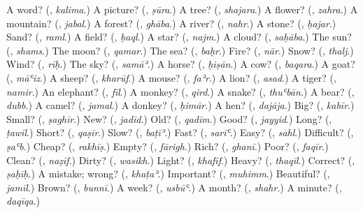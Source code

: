 \begin{tcolorbox}[breakable,colback=teal!4,colframe=teal!35!black,title={Before you move on}]
A word? (\textbf{}, \emph{kalima}.) A picture? (\textbf{}, \emph{ṣūra}.) A tree? (\textbf{}, \emph{shajara}.) A flower? (\textbf{}, \emph{zahra}.) A mountain? (\textbf{}, \emph{jabal}.) A forest? (\textbf{}, \emph{ghāba}.) A river? (\textbf{}, \emph{nahr}.) A stone? (\textbf{}, \emph{ḥajar}.) Sand? (\textbf{}, \emph{raml}.) A field? (\textbf{}, \emph{ḥaql}.) A star? (\textbf{}, \emph{najm}.) A cloud? (\textbf{}, \emph{saḥāba}.) The sun? (\textbf{}, \emph{shams}.) The moon? (\textbf{}, \emph{qamar}.) The sea? (\textbf{}, \emph{baḥr}.) Fire? (\textbf{}, \emph{nār}.) Snow? (\textbf{}, \emph{thalj}.) Wind? (\textbf{}, \emph{rīḥ}.) The sky? (\textbf{}, \emph{samāʾ}.) A horse? (\textbf{}, \emph{ḥiṣān}.) A cow? (\textbf{}, \emph{baqara}.) A goat? (\textbf{}, \emph{māʿiz}.) A sheep? (\textbf{}, \emph{kharūf}.) A mouse? (\textbf{}, \emph{faʾr}.) A lion? (\textbf{}, \emph{asad}.) A tiger? (\textbf{}, \emph{namir}.) An elephant? (\textbf{}, \emph{fīl}.) A monkey? (\textbf{}, \emph{qird}.) A snake? (\textbf{}, \emph{thuʿbān}.) A bear? (\textbf{}, \emph{dubb}.) A camel? (\textbf{}, \emph{jamal}.) A donkey? (\textbf{}, \emph{ḥimār}.) A hen? (\textbf{}, \emph{dajāja}.) Big? (\textbf{}, \emph{kabīr}.) Small? (\textbf{}, \emph{ṣaghīr}.) New? (\textbf{}, \emph{jadīd}.) Old? (\textbf{}, \emph{qadīm}.) Good? (\textbf{}, \emph{jayyid}.) Long? (\textbf{}, \emph{ṭawīl}.) Short? (\textbf{}, \emph{qaṣīr}.) Slow? (\textbf{}, \emph{baṭīʾ}.) Fast? (\textbf{}, \emph{sarīʿ}.) Easy? (\textbf{}, \emph{sahl}.) Difficult? (\textbf{}, \emph{ṣaʿb}.) Cheap? (\textbf{}, \emph{rakhīṣ}.) Empty? (\textbf{}, \emph{fārigh}.) Rich? (\textbf{}, \emph{ghanī}.) Poor? (\textbf{}, \emph{faqīr}.) Clean? (\textbf{}, \emph{naẓīf}.) Dirty? (\textbf{}, \emph{wasikh}.) Light? (\textbf{}, \emph{khafīf}.) Heavy? (\textbf{}, \emph{thaqīl}.) Correct? (\textbf{}, \emph{ṣaḥīḥ}.) A mistake; wrong? (\textbf{}, \emph{khaṭaʾ}.) Important? (\textbf{}, \emph{muhimm}.) Beautiful? (\textbf{}, \emph{jamīl}.) Brown? (\textbf{}, \emph{bunnī}.) A week? (\textbf{}, \emph{usbūʿ}.) A month? (\textbf{}, \emph{shahr}.) A minute? (\textbf{}, \emph{daqīqa}.)
\end{tcolorbox}
